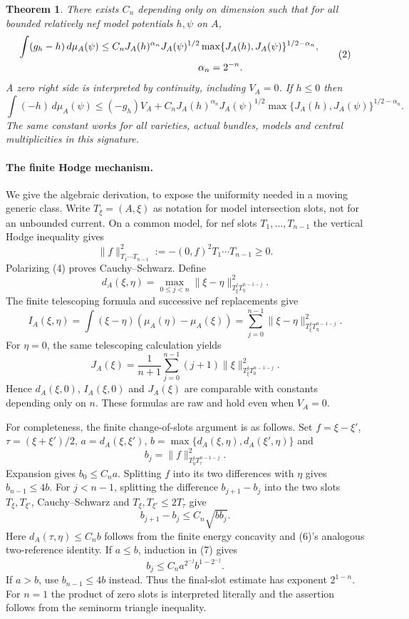 \documentclass[10pt]{article}
\newtheorem{theorem}{Theorem}
\begin{document}
\begin{theorem}\label{moment}
There exists $C_n$ depending only on dimension such that for all
bounded relatively nef model potentials $h,\psi$ on $A$,
\[
 \begin{split}
 \int(g_h-h)\,d\mu_A(\psi)
 &\le C_n J_A(h)^{\alpha_n}J_A(\psi)^{1/2}
       \max\{J_A(h),J_A(\psi)\}^{1/2-\alpha_n},\\
 &\hspace{35mm}\alpha_n=2^{-n}.
 \end{split}                                           \tag{2}
\]
A zero right side is interpreted by continuity, including $V_A=0$.
If $h\le0$ then
\[
 \int(-h)\,d\mu_A(\psi)
 \le(-g_h)V_A+C_n J_A(h)^{\alpha_n}J_A(\psi)^{1/2}
       \max\{J_A(h),J_A(\psi)\}^{1/2-\alpha_n}.          \tag{3}
\]
The same constant works for all varieties, actual bundles, models and
central multiplicities in this signature.
\end{theorem}

\paragraph{The finite Hodge mechanism.}
We give the algebraic derivation, to expose the uniformity needed in a
moving generic class. Write $T_\xi=(A,\xi)$ as notation for model
intersection slots, not for an unbounded current. On a common model,
for nef slots $T_1,\ldots,T_{n-1}$ the vertical Hodge inequality gives
\[
 \|f\|_{T_1\cdots T_{n-1}}^2
 :=-(0,f)^2T_1\cdots T_{n-1}\ge0.                     \tag{4}
\]
Polarizing (4) proves Cauchy--Schwarz. Define
\[
 d_A(\xi,\eta)=\max_{0\le j<n}
            \|\xi-\eta\|_{T_\xi^jT_\eta^{n-1-j}}^2.
\]
The finite telescoping formula and successive nef replacements give
\[
 I_A(\xi,\eta)=\int(\xi-\eta)(\mu_A(\eta)-\mu_A(\xi))
     =\sum_{j=0}^{n-1}\|\xi-\eta\|_{T_\xi^jT_\eta^{n-1-j}}^2.
 \tag{5}
\]
For $\eta=0$, the same telescoping calculation yields
\[
 J_A(\xi)=\frac1{n+1}\sum_{j=0}^{n-1}(j+1)
                         \|\xi\|_{T_\xi^jT_0^{n-1-j}}^2.
 \tag{6}
\]
Hence $d_A(\xi,0)$, $I_A(\xi,0)$ and $J_A(\xi)$ are comparable
with constants depending only on $n$. These formulas are raw and
hold even when $V_A=0$.

For completeness, the finite change-of-slots argument is as follows.
Set $f=\xi-\xi'$, $\tau=(\xi+\xi')/2$, $a=d_A(\xi,\xi')$,
$b=\max\{d_A(\xi,\eta),d_A(\xi',\eta)\}$ and
\[
 b_j=\|f\|_{T_\eta^jT_\tau^{n-1-j}}^2.
\]
Expansion gives $b_0\le C_na$. Splitting $f$ into its two differences
with $\eta$ gives $b_{n-1}\le4b$. For $j<n-1$, splitting the difference
$b_{j+1}-b_j$ into the two slots $T_\xi,T_{\xi'}$, Cauchy--Schwarz
and $T_\xi,T_{\xi'}\le2T_\tau$ give
\[
 b_{j+1}-b_j\le C_n\sqrt{b b_j}.                     \tag{7}
\]
Here $d_A(\tau,\eta)\le C_nb$ follows from the finite energy
concavity and (6)'s analogous two-reference identity. If $a\le b$,
induction in (7) gives
\[
 b_j\le C_n a^{2^{-j}}b^{1-2^{-j}}.
\]
If $a>b$, use $b_{n-1}\le4b$ instead. Thus the final-slot estimate has
exponent $2^{1-n}$. For $n=1$ the product of zero slots is interpreted
literally and the assertion follows from the seminorm triangle inequality.
\end{document}
